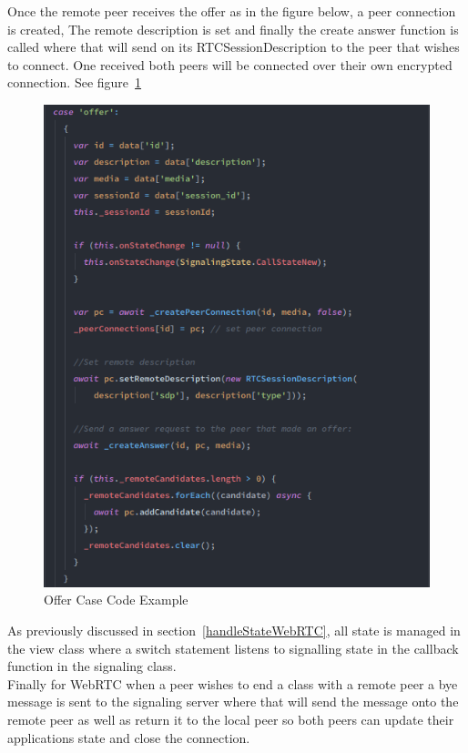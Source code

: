 Once the remote peer receives the offer as in the figure below, a peer connection is created,
The remote description is set and finally the create answer function is called where that will send on its RTCSessionDescription to the peer that wishes to connect. One received both peers will be connected over their own encrypted connection. See figure~\ref{image:offerCaseCode}
\begin{figure}[h!]
    \caption{Offer Case Code Example}
    \label{image:offerCaseCode}
    \centering
    \includegraphics[width=1.0\textwidth]{images/offer_case_code.png}
\end{figure}

As previously discussed in  section~\ref{handleStateWebRTC}, all state is managed in the view class where a switch statement listens to signalling state in the callback function in the signaling class.
\\ Finally for WebRTC when a peer wishes to end a class with a remote peer a bye message is sent to the signaling server where that will send the message onto the remote peer as well as return it to the local peer so both peers can update their applications state and close the connection.  


